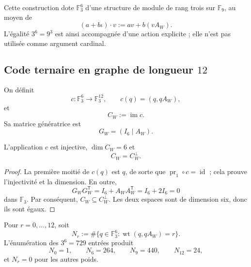 Cette construction dote \(\mathbb F_3^6\) d'une structure de module de rang
trois sur \(\mathbb F_9\), au moyen de
\begin{equation}
 (a+b\iota)\cdot v:=av+b(vA_W).
 \label{p12-83-c20-s1:eq:accion-f9-sobre-f3-seis}
\end{equation}
L'égalité \(3^6=9^3\) est ainsi accompagnée d'une action explicite ; elle n'est pas
utilisée comme argument cardinal.

\subsection{Code ternaire en graphe de longueur \(12\)}

On définit
\begin{equation}
 c:\mathbb F_3^6\longrightarrow\mathbb F_3^{12},
 \qquad
 c(q)=(q,qA_W),
 \label{p12-83-c20-s1:eq:aplicacion-codigo-grafico-witt}
\end{equation}
et
\begin{equation}
 C_W:=\operatorname{im}c.
 \label{p12-83-c20-s1:eq:definicion-codigo-witt-ternario}
\end{equation}
Sa matrice génératrice est
\[
 G_W=(I_6\mid A_W).
\]

\begin{theorem}
\label{p12-83-c20-s1:thm:cw-inyectivo-autodual}
L'application \(c\) est injective, \(\dim C_W=6\) et
\begin{equation}
 \boxed{C_W=C_W^\perp.}
 \label{p12-83-c20-s1:eq:cw-autodual}
\end{equation}
\end{theorem}

\begin{proof}
La première moitié de \(c(q)\) est \(q\), de sorte que
\(\operatorname{pr}_1\circ c=\operatorname{id}\) ; cela prouve
l'injectivité et la dimension. En outre,
\[
 G_WG_W^{\mathsf T}
 =I_6+A_WA_W^{\mathsf T}
 =I_6+2I_6=0
\]
dans \(\mathbb F_3\). Par conséquent, \(C_W\subseteq C_W^\perp\). Les deux espaces
sont de dimension six, donc ils sont égaux.
\end{proof}

Pour \(r=0,\ldots,12\), soit
\[
 N_r:=\#\{q\in\mathbb F_3^6:
            \operatorname{wt}(q,qA_W)=r\}.
\]
L'énumération des \(3^6=729\) entrées produit
\begin{equation}
 N_0=1,
 \qquad
 N_6=264,
 \qquad
 N_9=440,
 \qquad
 N_{12}=24,
 \label{p12-83-c20-s1:eq:censo-pesos-cw}
\end{equation}
et \(N_r=0\) pour les autres poids.


